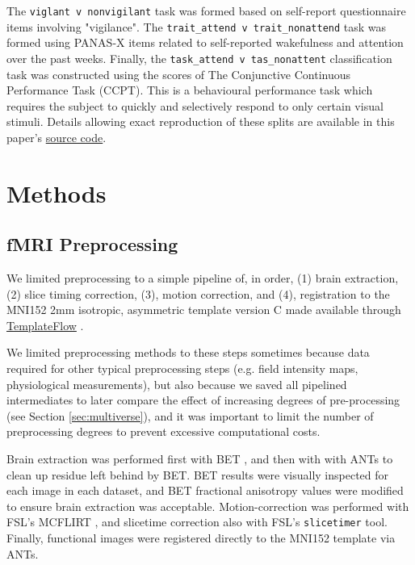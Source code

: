 \documentclass[12pt]{spieman}  %
\newcommand{\code}[1]{\small \texttt{#1} \normalsize}
\begin{document}
\begin{spacing}{2}
The \code{viglant v nonvigilant} task was formed based on self-report
questionnaire items involving
"vigilance"\cite{gorgolewskiCorrespondenceIndividualDifferences2014}. The
\code{trait\_attend v trait\_nonattend} task was formed using PANAS-X
\cite{watsonPANASXManualPositive1994} items related to self-reported
wakefulness and attention over the past weeks. Finally, the
\code{task\_attend v tas\_nonattent} classification task was constructed
using the scores of The Conjunctive Continuous Performance Task
(CCPT\cite{shalevConjunctiveContinuousPerformance2011}). This is a behavioural
performance task which requires the subject to quickly and selectively respond
to only certain visual stimuli. Details allowing exact reproduction of these
splits are available in this paper's
\href{https://github.com/DM-Berger/random-matrix-fmri/blob/master/code/rmt/preprocess/unify\_attention\_data.py}{source
code}.



\section{Methods}
\label{sec:methods}

\subsection{fMRI Preprocessing}
\label{sec:preproc}


We limited preprocessing to a simple pipeline of, in order, (1) brain
extraction, (2) slice timing correction, (3), motion correction, and (4),
registration to the MNI152
\cite{fonovUnbiasedAverageAgeappropriate2011,fonovUnbiasedNonlinearAverage2009}
2mm isotropic, asymmetric template version C made available through
\href{https://www.templateflow.org/}{TemplateFlow}
\cite{ciricTemplateFlowFAIRsharingMultiscale2021}.

We limited preprocessing methods to these steps sometimes because data required
for other typical preprocessing steps (e.g. field intensity maps, physiological
measurements), but also because we saved all pipelined intermediates to later
compare the effect of increasing degrees of pre-processing (see Section
\ref{sec:multiverse}), and it was important to limit the number of
preprocessing degrees to prevent excessive computational costs.

Brain extraction was performed first with BET
\cite{smithFastRobustAutomated2002}, and then with with
ANTs\cite{avantsReproducibleEvaluationANTs2011} to clean up residue left behind
by BET. BET results were visually inspected for each image in each dataset, and
BET fractional anisotropy values were modified to ensure brain extraction was
acceptable. Motion-correction was performed with FSL's MCFLIRT
\cite{jenkinsonImprovedOptimizationRobust2002}, and slicetime correction also
with FSL's \code{slicetimer}\cite{jenkinsonFSL2012} tool. Finally, functional
images were registered directly to the MNI152 template via
ANTs\cite{avantsReproducibleEvaluationANTs2011}.



\end{spacing}
\end{document}
